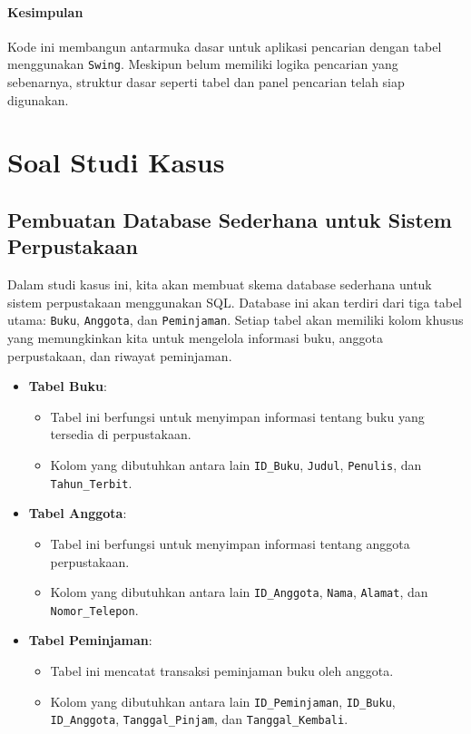 \paragraph{Kesimpulan}
Kode ini membangun antarmuka dasar untuk aplikasi pencarian dengan tabel menggunakan \texttt{Swing}. Meskipun belum memiliki logika pencarian yang sebenarnya, struktur dasar seperti tabel dan panel pencarian telah siap digunakan.


\section{Soal Studi Kasus}

\subsection{Pembuatan Database Sederhana untuk Sistem Perpustakaan}
Dalam studi kasus ini, kita akan membuat skema database sederhana untuk sistem perpustakaan menggunakan SQL. Database ini akan terdiri dari tiga tabel utama: \texttt{Buku}, \texttt{Anggota}, dan \texttt{Peminjaman}. Setiap tabel akan memiliki kolom khusus yang memungkinkan kita untuk mengelola informasi buku, anggota perpustakaan, dan riwayat peminjaman.

\begin{itemize}
	\item \textbf{Tabel Buku}:
	\begin{itemize}
		\item Tabel ini berfungsi untuk menyimpan informasi tentang buku yang tersedia di perpustakaan.
		\item Kolom yang dibutuhkan antara lain \texttt{ID\_Buku}, \texttt{Judul}, \texttt{Penulis}, dan \texttt{Tahun\_Terbit}.
	\end{itemize}
	
	\item \textbf{Tabel Anggota}:
	\begin{itemize}
		\item Tabel ini berfungsi untuk menyimpan informasi tentang anggota perpustakaan.
		\item Kolom yang dibutuhkan antara lain \texttt{ID\_Anggota}, \texttt{Nama}, \texttt{Alamat}, dan \texttt{Nomor\_Telepon}.
	\end{itemize}
	
	\item \textbf{Tabel Peminjaman}:
	\begin{itemize}
		\item Tabel ini mencatat transaksi peminjaman buku oleh anggota.
		\item Kolom yang dibutuhkan antara lain \texttt{ID\_Peminjaman}, \texttt{ID\_Buku}, \texttt{ID\_Anggota}, \texttt{Tanggal\_Pinjam}, dan \texttt{Tanggal\_Kembali}.
	\end{itemize}
\end{itemize}

